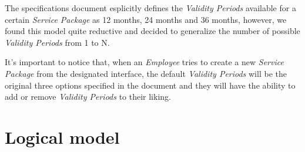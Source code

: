 The specifications document esplicitly defines the \textit{Validity Periods} available for a certain \textit{Service Package} as 12 months, 24 months and 36 months, however, we found this model quite reductive and decided to generalize the number of possible \textit{Validity Periods} from 1 to N.

It's important to notice that, when an \textit{Employee} tries to create a new \textit{Service Package} from the designated interface, the default \textit{Validity Periods} will be the original three options specified in the document and they will have the ability to add or remove \textit{Validity Periods} to their liking.


\section{Logical model}
\label{sec:logical_model}


\blindtext

